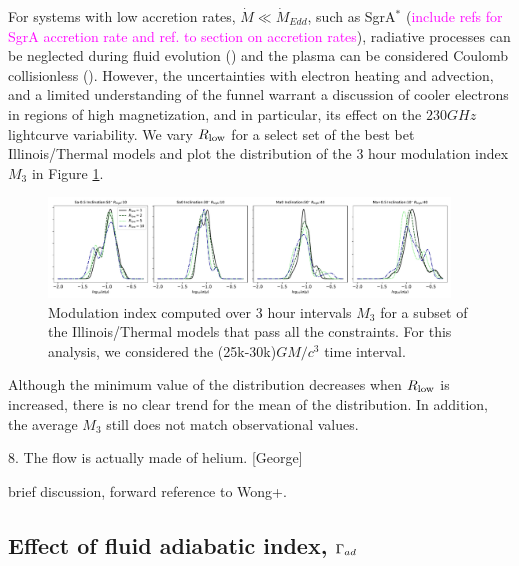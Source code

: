 For systems with low accretion rates, $\Dot{M}\ll\Dot{M}_{Edd}$, such as SgrA$^{*}$ (\textcolor{magenta}{include refs for SgrA accretion rate and ref. to section on accretion rates}), radiative processes can be neglected during fluid evolution (\citealt{2012MNRAS.426.1928D, 10.1093/mnras/stw3116, Ryan_2017}) and the plasma can be considered Coulomb collisionless (\citealt{Mahadevan_1997, 10.1093/mnras/stw3116, Ryan_2017}). However, the uncertainties with electron heating and advection, and a limited understanding of the funnel warrant a discussion of cooler electrons in regions of high magnetization, and in particular, its effect on the $230GHz$ lightcurve variability. We vary $R_\mathrm{low}$ for a select set of the best bet Illinois/Thermal models and plot the distribution of the 3 hour modulation index $M_{3}$ in Figure \ref{fig:mi_rlow}.

\begin{figure}
\centering
\includegraphics[width=0.95\textwidth]{figures/mi_rlow_select_models.pdf}
\caption{Modulation index computed over 3 hour intervals $M_{3}$ for a subset of the Illinois/Thermal models that pass all the constraints. For this analysis, we considered the (25k-30k)$GM/c^{3}$ time interval.}
\label{fig:mi_rlow}
\end{figure}

Although the minimum value of the distribution decreases when $R_\mathrm{low}$ is increased, there is no clear trend for the mean of the distribution. In addition, the average $M_{3}$ still does not match observational values.

8. The flow is actually made of helium. [George]

brief discussion, forward reference to Wong+.


\subsection{Effect of fluid adiabatic index, $\Gamma_{\lowercase{ad}}$}

